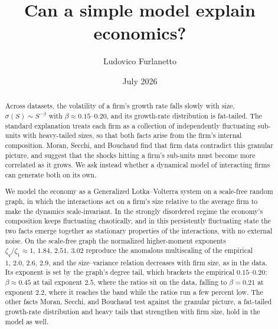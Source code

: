 \documentclass[12pt]{article}
\title{Can a simple model explain economics?}
\author{Ludovico Furlanetto}
\date{July 2026}
\begin{document}
\maketitle

\begin{abstract}
Across datasets, the volatility of a firm's growth rate falls slowly with size,
$\sigma(S)\sim S^{-\beta}$ with $\beta\approx0.15$--$0.20$, and its growth-rate distribution is
fat-tailed. The standard explanation treats each firm as a collection of independently fluctuating
sub-units with heavy-tailed sizes, so that both facts arise from the firm's internal
composition. Moran, Secchi, and Bouchaud find that firm data contradict this granular picture, and suggest
that the shocks hitting a firm's sub-units must become more correlated as it
grows. We ask instead
whether a dynamical model of interacting firms can generate both on its own.

We model the economy as a Generalized Lotka--Volterra system on a scale-free random graph, in
which the interactions act on a firm's size relative to the average firm to
make the dynamics scale-invariant. In the strongly disordered
regime the economy's composition keeps fluctuating chaotically, and in this persistently
fluctuating state the two facts emerge together as stationary properties of the
interactions, with no external noise. On the scale-free graph the normalized higher-moment
exponents $\zeta_q/\zeta_1\approx1,\,1.84,\,2.51,\,3.02$ reproduce the anomalous multiscaling
of the empirical $1,\,2.0,\,2.6,\,2.9$, and the size--variance relation decreases with firm
size, as in the data. Its exponent is set by the graph's degree tail, which brackets the
empirical $0.15$--$0.20$: $\beta \approx 0.45$ at tail exponent $2.5$, where the ratios sit
on the data, falling to $\beta = 0.21$ at exponent $2.2$, where it reaches the band while the
ratios run a few percent low. The other facts Moran, Secchi, and Bouchaud test against the
granular picture, a fat-tailed growth-rate distribution and heavy tails that strengthen
with firm size, hold in the model as well.
\end{abstract}
\end{document}
